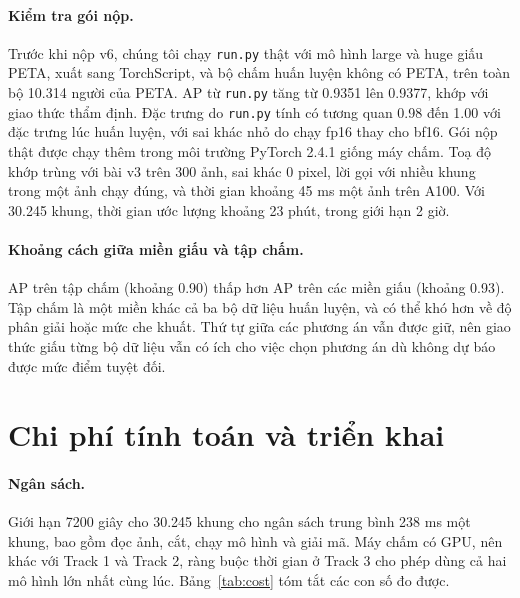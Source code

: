 \documentclass[11pt,a4paper]{article}
\begin{document}
\paragraph{Kiểm tra gói nộp.} Trước khi nộp v6, chúng tôi chạy \texttt{run.py} thật với mô hình large và huge giấu PETA, xuất sang TorchScript, và bộ chấm huấn luyện không có PETA, trên toàn bộ 10.314 người của PETA. AP từ \texttt{run.py} tăng từ 0.9351 lên 0.9377, khớp với giao thức thẩm định. Đặc trưng do \texttt{run.py} tính có tương quan 0.98 đến 1.00 với đặc trưng lúc huấn luyện, với sai khác nhỏ do chạy fp16 thay cho bf16. Gói nộp thật được chạy thêm trong môi trường PyTorch 2.4.1 giống máy chấm. Toạ độ khớp trùng với bài v3 trên 300 ảnh, sai khác 0 pixel, lời gọi với nhiều khung trong một ảnh chạy đúng, và thời gian khoảng 45 ms một ảnh trên A100. Với 30.245 khung, thời gian ước lượng khoảng 23 phút, trong giới hạn 2 giờ.

\paragraph{Khoảng cách giữa miền giấu và tập chấm.} AP trên tập chấm (khoảng 0.90) thấp hơn AP trên các miền giấu (khoảng 0.93). Tập chấm là một miền khác cả ba bộ dữ liệu huấn luyện, và có thể khó hơn về độ phân giải hoặc mức che khuất. Thứ tự giữa các phương án vẫn được giữ, nên giao thức giấu từng bộ dữ liệu vẫn có ích cho việc chọn phương án dù không dự báo được mức điểm tuyệt đối.

\section{Chi phí tính toán và triển khai}
\label{sec:deploy}

\paragraph{Ngân sách.} Giới hạn 7200 giây cho 30.245 khung cho ngân sách trung bình 238 ms một khung, bao gồm đọc ảnh, cắt, chạy mô hình và giải mã. Máy chấm có GPU, nên khác với Track 1 và Track 2, ràng buộc thời gian ở Track 3 cho phép dùng cả hai mô hình lớn nhất cùng lúc. Bảng~\ref{tab:cost} tóm tắt các con số đo được.
\end{document}
